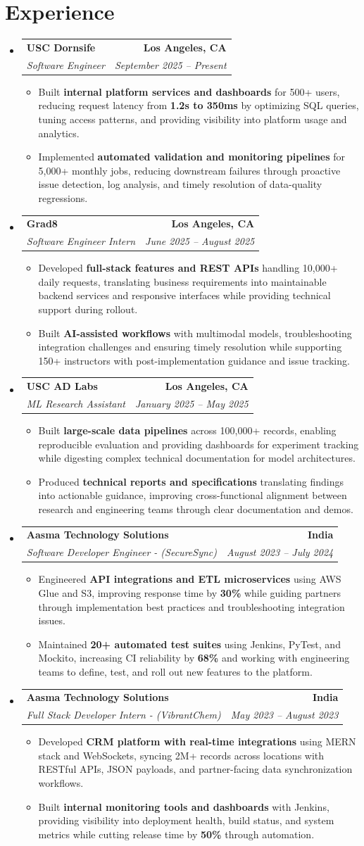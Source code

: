 \documentclass[letterpaper,10pt]{article}
\makeatletter
\newcommand{\resumeItem}[1]{\item\small{{#1 \vspace{-2pt}}}}
\newcommand{\resumeSubheading}[4]{\vspace{-1pt}\item\begin{tabular*}{1.0\textwidth}[t]{l@{\extracolsep{\fill}}r}\textbf{#1} & \textbf{\small #2} \\\textit{\small#3} & \textit{\small #4} \\\end{tabular*}\vspace{-2pt}}
\newcommand{\resumeSubHeadingListStart}{\begin{itemize}[leftmargin=0.0in, label={}]}
\newcommand{\resumeSubHeadingListEnd}{\end{itemize}}
\newcommand{\resumeItemListStart}{\begin{itemize}[leftmargin=0.15in,label=\textbullet,itemsep=2pt,topsep=0pt,parsep=0pt,partopsep=0pt]}
\newcommand{\resumeItemListEnd}{\end{itemize}\vspace{-4pt}}
\makeatother
\begin{document}
\section{Experience}
\resumeSubHeadingListStart
\resumeSubheading{USC Dornsife}{Los Angeles, CA}{Software Engineer}{September 2025 -- Present}
\resumeItemListStart
\resumeItem{Built \textbf{internal platform services and dashboards} for 500+ users, reducing request latency from \textbf{1.2s to 350ms} by optimizing SQL queries, tuning access patterns, and providing visibility into platform usage and analytics.}
\resumeItem{Implemented \textbf{automated validation and monitoring pipelines} for 5,000+ monthly jobs, reducing downstream failures through proactive issue detection, log analysis, and timely resolution of data-quality regressions.}
\resumeItemListEnd
\resumeSubheading{Grad8}{Los Angeles, CA}{Software Engineer Intern}{June 2025 -- August 2025}
\resumeItemListStart
\resumeItem{Developed \textbf{full-stack features and REST APIs} handling 10,000+ daily requests, translating business requirements into maintainable backend services and responsive interfaces while providing technical support during rollout.}
\resumeItem{Built \textbf{AI-assisted workflows} with multimodal models, troubleshooting integration challenges and ensuring timely resolution while supporting 150+ instructors with post-implementation guidance and issue tracking.}
\resumeItemListEnd
\resumeSubheading{USC AD Labs}{Los Angeles, CA}{ML Research Assistant}{January 2025 -- May 2025}
\resumeItemListStart
\resumeItem{Built \textbf{large-scale data pipelines} across 100,000+ records, enabling reproducible evaluation and providing dashboards for experiment tracking while digesting complex technical documentation for model architectures.}
\resumeItem{Produced \textbf{technical reports and specifications} translating findings into actionable guidance, improving cross-functional alignment between research and engineering teams through clear documentation and demos.}
\resumeItemListEnd
\resumeSubheading{Aasma Technology Solutions}{India}{Software Developer Engineer - (SecureSync)}{August 2023 -- July 2024}
\resumeItemListStart
\resumeItem{Engineered \textbf{API integrations and ETL microservices} using AWS Glue and S3, improving response time by \textbf{30\%} while guiding partners through implementation best practices and troubleshooting integration issues.}
\resumeItem{Maintained \textbf{20+ automated test suites} using Jenkins, PyTest, and Mockito, increasing CI reliability by \textbf{68\%} and working with engineering teams to define, test, and roll out new features to the platform.}
\resumeItemListEnd
\resumeSubheading{Aasma Technology Solutions}{India}{Full Stack Developer Intern - (VibrantChem)}{May 2023 -- August 2023}
\resumeItemListStart
\resumeItem{Developed \textbf{CRM platform with real-time integrations} using MERN stack and WebSockets, syncing 2M+ records across locations with RESTful APIs, JSON payloads, and partner-facing data synchronization workflows.}
\resumeItem{Built \textbf{internal monitoring tools and dashboards} with Jenkins, providing visibility into deployment health, build status, and system metrics while cutting release time by \textbf{50\%} through automation.}
\resumeItemListEnd
\resumeSubHeadingListEnd
\vspace{-14pt}
\end{document}
